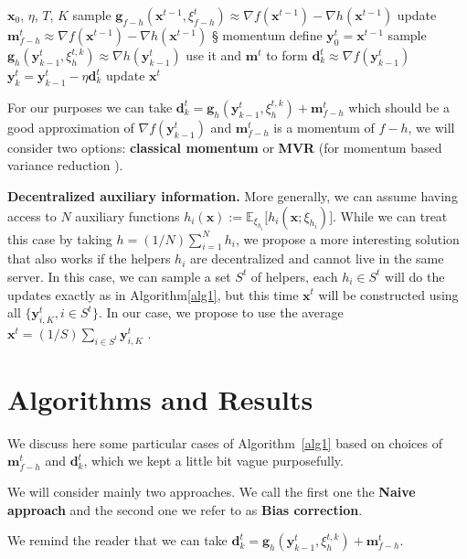 \documentclass[10pt]{article} %
\theoremstyle{plain}
\theoremstyle{definition}
\theoremstyle{remark}
\def\vd{{\bm{d}}}
\def\vg{{\bm{g}}}
\def\vm{{\bm{m}}}
\def\vx{{\bm{x}}}
\def\vy{{\bm{y}}}
\newcommand{\E}{\mathbb{E}}
\begin{document}
\begin{algorithm}[h]
\begin{algorithmic}
\REQUIRE $\vx_0$, $\eta$, $T$, $K$
\STATE sample $\vg_{f-h}(\vx^{t-1},\xi^t_{f-h})\approx \nabla f(\vx^{t-1})- \nabla h(\vx^{t-1})$
\STATE update $\vm_{f-h}^t\approx \nabla f(\vx^{t-1}) - \nabla h(\vx^{t-1})$ § momentum
\STATE define $\vy^t_0=\vx^{t-1}$
\STATE sample $\vg_h(\vy^{t}_{k-1},\xi^{t,k}_h)\approx \nabla h(\vy^{t}_{k-1})$
\STATE use it and $\vm^t$ to form $\vd^t_k \approx \nabla f(\vy^{t}_{k-1})$
\STATE $\vy^t_{k} = \vy^t_{k-1} - \eta \vd^t_k$
\ENDFOR
\STATE update $\vx^t$
\ENDFOR
\end{algorithmic}
\caption{stochastic optimization of $f$ with access to the auxiliary $h$} 
\label{alg1}
\end{algorithm}

For our purposes we can take $\vd^t_k= \vg_h(\vy^{t}_{k-1},\xi^{t,k}_h) + \vm^t_{f-h}$ which should be a good approximation of $\nabla f(\vy^t_{k-1})$ and $\vm^t_{f-h}$ is a momentum of $f-h$, we will consider two options: \textbf{classical momentum} or \textbf{MVR} (for momentum based variance reduction \citep{MVR}).

\textbf{Decentralized auxiliary information.}
More generally, we can assume having access to $N$ auxiliary functions $h_i(\vx) := \E_{\xi_{h_i}}\big[ h_i(\vx; \xi_{h_i})\big]$. While we can treat this case by taking $h = (1/N)\sum_{i=1}^N h_i$, we propose a more interesting solution that also works if the helpers $h_i$ are decentralized and cannot live in the same server. In this case, we can sample a set $S^t$ of helpers, each $h_i\in S^t$ will do the updates exactly as in Algorithm\ref{alg1}, but this time $\vx^t$ will be constructed using all $\{\vy^t_{i, K},i\in S^t\}$. In our case, we propose to use the average $\vx^t = (1/S)\sum_{i\in S^t} \vy^t_{i,K}$ . 

\section{Algorithms and Results}
We discuss here some particular cases of Algorithm~\ref{alg1} based on choices of $\vm^t_{f-h}$ and $\vd^t_k$, which we kept a little bit vague purposefully.

We will consider mainly two approaches. We call the first one the  \textbf{Naive approach} and the second one we refer to as \textbf{Bias correction}.

We remind the reader that we can take $\vd^t_k= \vg_h(\vy^{t}_{k-1},\xi^{t,k}_h) + \vm^t_{f-h}$.
\end{document}
